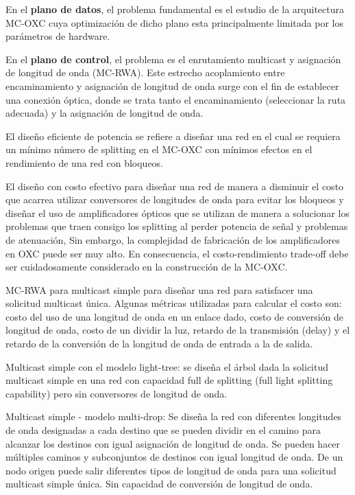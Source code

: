En el \textbf{plano de datos}, el problema fundamental es el estudio
de la arquitectura MC-OXC cuya optimización de dicho plano esta principalmente
limitada por los parámetros de hardware.

En el \textbf{plano de control}, el problema es el enrutamiento multicast
y asignación de longitud de onda (MC-RWA). Este estrecho acoplamiento
entre encaminamiento y asignación de longitud de onda surge con el
fin de establecer una conexión óptica, donde se trata tanto el encaminamiento
(seleccionar la ruta adecuada) y la asignación de longitud de onda.

El diseño eficiente de potencia se refiere a diseñar una red en el
cual se requiera un mínimo número de splitting en el MC-OXC con mínimos
efectos en el rendimiento de una red con bloqueos.

El diseño con costo efectivo para diseñar una red de manera a disminuir
el costo que acarrea utilizar conversores de longitudes de onda para
evitar los bloqueos y diseñar el uso de amplificadores ópticos que
se utilizan de manera a solucionar los problemas que traen consigo
los splitting al perder potencia de señal y problemas de atenuación,
Sin embargo, la complejidad de fabricación de los amplificadores en
OXC puede ser muy alto. En consecuencia, el costo-rendimiento trade-off
debe ser cuidadosamente considerado en la construcción de la MC-OXC.

MC-RWA para multicast simple para diseñar una red para satisfacer
una solicitud multicast única. Algunas métricas utilizadas para calcular
el costo son: costo del uso de una longitud de onda en un enlace dado,
costo de conversión de longitud de onda, costo de un dividir la luz,
retardo de la transmisión (delay) y el retardo de la conversión de
la longitud de onda de entrada a la de salida.

Multicast simple con el modelo light-tree: se diseña el árbol dada
la solicitud multicast simple en una red con capacidad full de splitting
(full light splitting capability) pero sin conversores de longitud
de onda.

Multicast simple - modelo multi-drop: Se diseña la red con diferentes
longitudes de onda designadas a cada destino que se pueden dividir
en el camino para alcanzar los destinos con igual asignación de longitud
de onda. Se pueden hacer múltiples caminos y subconjuntos de destinos
con igual longitud de onda. De un nodo origen puede salir diferentes
tipos de longitud de onda para una solicitud multicast simple única.
Sin capacidad de conversión de longitud de onda.

